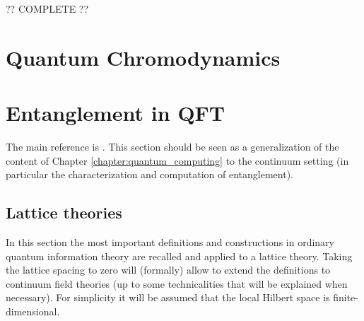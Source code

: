     ?? COMPLETE ??

\section{Quantum Chromodynamics}


\section{Entanglement in QFT}

    The main reference is \cite{entanglement_entropy, tuybens}. This section should be seen as a generalization of the content of Chapter \ref{chapter:quantum_computing} to the continuum setting (in particular the characterization and computation of entanglement).

\subsection{Lattice theories}

    In this section the most important definitions and constructions in ordinary quantum information theory are recalled and applied to a lattice theory. Taking the lattice spacing to zero will (formally) allow to extend the definitions to continuum field theories (up to some technicalities that will be explained when necessary). For simplicity it will be assumed that the local Hilbert space is finite-dimensional.


